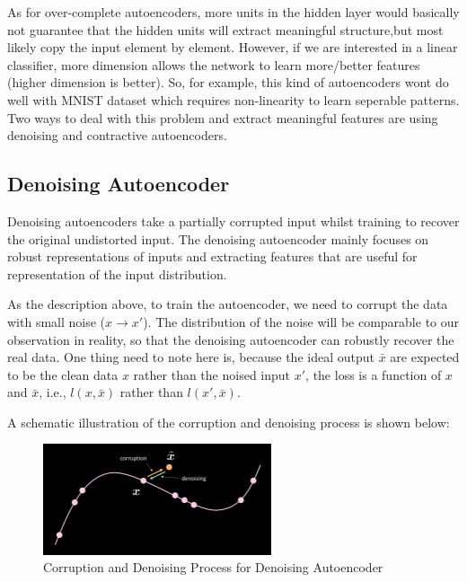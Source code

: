 As for over-complete autoencoders, more units in the hidden layer would basically not guarantee that the hidden units will extract meaningful structure,but most likely copy the input element by element. However, if we are interested in a linear classifier, more dimension allows the network to learn more/better features (higher dimension is better). So, for example, this kind of autoencoders wont do well with MNIST dataset which requires non-linearity to learn seperable patterns. Two ways to deal with this problem and extract meaningful features are using denoising and contractive autoencoders.

\subsection{Denoising Autoencoder}

Denoising autoencoders take a partially corrupted input whilst training to recover the original undistorted input. The denoising autoencoder mainly focuses on robust representations of inputs and extracting features that are useful for representation of the input distribution.

As the description above, to train the autoencoder, we need to corrupt the data with small noise ($x \rightarrow x'$). The distribution of the noise will be comparable to our observation in reality, so that the denoising autoencoder can robustly recover the real data.
One thing need to note here is, because the ideal output $\bar{x}$ are expected to be the clean data $x$ rather than the noised input $x'$, the loss is a function of $x$ and $\bar{x}$, i.e., $l(x,\bar{x})$ rather than $l(x',\bar{x})$.

A schematic illustration of the corruption and denoising process is shown below:

\begin{figure}[htb]
    \centering
    \includegraphics[width=0.6\textwidth]{labs/10/images/Corrpution_and_Denoising.png}
    \caption{Corruption and Denoising Process for Denoising Autoencoder}
    \label{fig:Corrpution_and_Denoising}
\end{figure}

